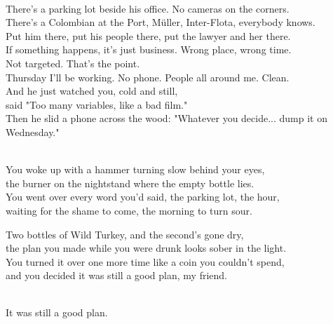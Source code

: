 \begin{lyrics}
\\
There's a parking lot beside his office. No cameras on the corners.\\
There's a Colombian at the Port, Müller, Inter-Flota, everybody knows.\\
Put him there, put his people there, put the lawyer and her there.\\
If something happens, it's just business. Wrong place, wrong time.\\
Not targeted. That's the point.\\
Thursday I'll be working. No phone. People all around me. Clean.
\\
And he just watched you, cold and still,\\
said "Too many variables, like a bad film."\\
Then he slid a phone across the wood:
"Whatever you decide... dump it on Wednesday."

\\
You woke up with a hammer turning slow behind your eyes,\\
the burner on the nightstand where the empty bottle lies.\\
You went over every word you'd said, the parking lot, the hour,\\
waiting for the shame to come, the morning to turn sour.

Two bottles of Wild Turkey, and the second's gone dry,\\
the plan you made while you were drunk looks sober in the light.\\
You turned it over one more time like a coin you couldn't spend,\\
and you decided it was still a good plan, my friend.

\\
It was still a good plan.
\end{lyrics}


